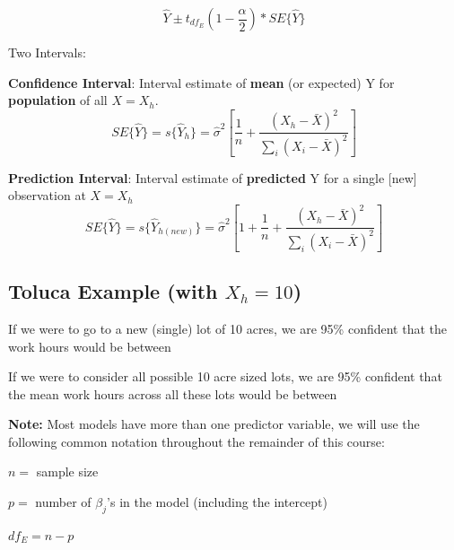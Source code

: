 \documentclass[12pt]{../notes}
\begin{document}
\[
\hat{Y} \pm t_{df_E}(1-\frac{\alpha}{2})*SE\{\hat{Y}\}
\]

Two Intervals:
\bi
\item \textbf{Confidence Interval}: Interval estimate of \textbf{mean} (or expected) Y for \textbf{population} of all $X = X_h.$
\[SE\{\hat{Y}\} = s\{\hat{Y}_h\} = \hat{\sigma}^2\left[\frac{1}{n} + \frac{(X_h - \bar{X})^2}{\sum_i (X_i - \bar{X})^2}\right]\]
\item \textbf{Prediction Interval}: Interval estimate of \textbf{predicted} Y for a single [new] observation at $X = X_h$
\[SE\{\hat{Y}\} = s\{\hat{Y}_{h (new)}\} = \hat{\sigma}^2\left[1 + \frac{1}{n} + \frac{(X_h - \bar{X})^2}{\sum_i (X_i - \bar{X})^2}\right]\]
\ei

\subsection*{Toluca Example (with $X_h = 10$)}
\bi
\item If we were to go to a new (single) lot of 10 acres, we are 95\% confident that the work hours would be between 
 
 \begin{minipage}[l][2cm][c]{\textwidth}
\end{minipage}

\item If we were to consider all possible 10 acre sized lots, we are 95\% confident that the mean work hours across all these lots would be between  

 \begin{minipage}[l][2cm][c]{\textwidth}
\end{minipage}
\ei

\textbf{Note:} Most models have more than one predictor variable, we will use the following common notation throughout the remainder of this course:
\bi
\item $n =$ sample size
\item $p =$ number of $\beta_j$'s in the model (including the intercept)
\item $df_E = n-p$
\ei
















\end{document}
